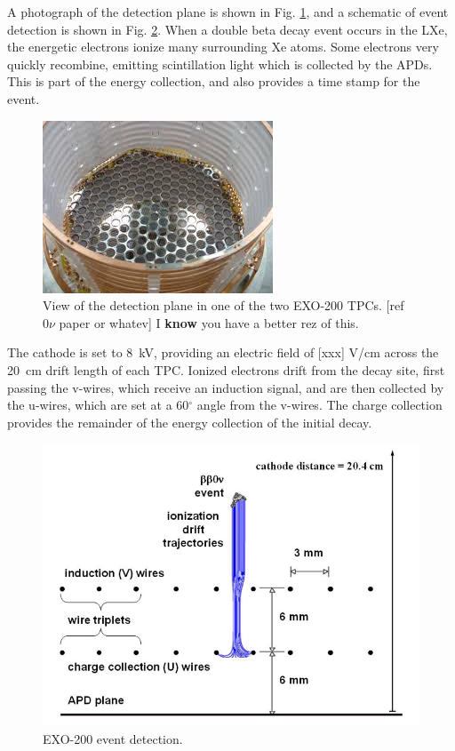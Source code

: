 A photograph of the detection plane is shown in Fig. \ref{fig:tpcphoto}, and a schematic of event detection is shown in Fig. \ref{fig:detectionplane}.  When a double beta decay event occurs in the LXe, the energetic electrons ionize many surrounding Xe atoms.  Some electrons very quickly recombine, emitting scintillation light which is collected by the APDs.  This is part of the energy collection, and also provides a time stamp for the event.  

\begin{figure}[H]
	\centering
	\includegraphics[width=.7\textwidth]{figures/TPCphoto.jpg}
	\caption{View of the detection plane in one of the two EXO-200 TPCs.  [ref $0\nu$ paper or whatev]  {\color{red}I \textbf{know} you have a better rez of this.}}
\label{fig:tpcphoto}
\end{figure}

The cathode is set to 8~kV, providing an electric field of [xxx] V/cm across the 20~cm drift length of each TPC.  Ionized electrons drift from the decay site, first passing the v-wires, which receive an induction signal, and are then collected by the u-wires, which are set at a  {\color{red}60$^\circ$} angle from the v-wires.  The charge collection provides the remainder of the energy collection of the initial decay.

\begin{figure}[H]
	\centering
	\includegraphics[width=.7\textwidth]{figures/anodecathodedriftcharges.png}
	\caption{EXO-200 event detection.  }
\label{fig:detectionplane}
\end{figure}


